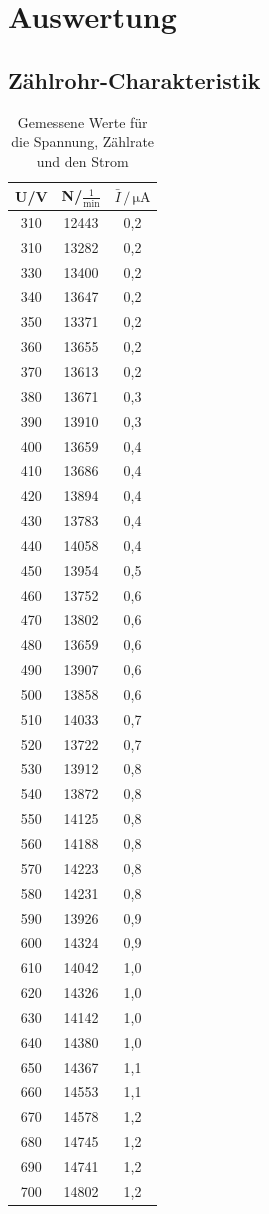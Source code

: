 
\section{Auswertung}
\subsection{Zählrohr-Charakteristik}
\begin{table}
\centering
\caption{Gemessene Werte für die Spannung, Zählrate und den Strom}
\label{tab:werte}
\begin{tabular}{c c c}
\toprule
{U/V} & {N/$\mathrm{\frac{1}{min}}$} & {$\bar{I}\,/\, \mathrm{\mu A}$}\\
\midrule
310 & 12443 & 0,2\\
310 & 13282 & 0,2\\
330 & 13400 & 0,2\\
340 & 13647 & 0,2\\
350 & 13371 & 0,2\\
360 & 13655 & 0,2\\
370 & 13613 & 0,2\\
380 & 13671 & 0,3\\
390 & 13910 & 0,3\\
400 & 13659 & 0,4\\
410 & 13686 & 0,4\\
420 & 13894 & 0,4\\
430 & 13783 & 0,4\\
440 & 14058 & 0,4\\
450 & 13954 & 0,5\\
460 & 13752 & 0,6\\
470 & 13802 & 0,6\\
480 & 13659 & 0,6\\
490 & 13907 & 0,6\\
500 & 13858 & 0,6\\
510 & 14033 & 0,7\\
520 & 13722 & 0,7\\
530 & 13912 & 0,8\\
540 & 13872 & 0,8\\
550 & 14125 & 0,8\\
560 & 14188 & 0,8\\
570 & 14223 & 0,8\\
580 & 14231 & 0,8\\
590 & 13926 & 0,9\\
600 & 14324 & 0,9\\
610 & 14042 & 1,0\\
620 & 14326 & 1,0\\
630 & 14142 & 1,0\\
640 & 14380 & 1,0\\
650 & 14367 & 1,1\\
660 & 14553 & 1,1\\
670 & 14578 & 1,2\\
680 & 14745 & 1,2\\
690 & 14741 & 1,2\\
700 & 14802 & 1,2\\
\bottomrule
\end{tabular}
\end{table}

